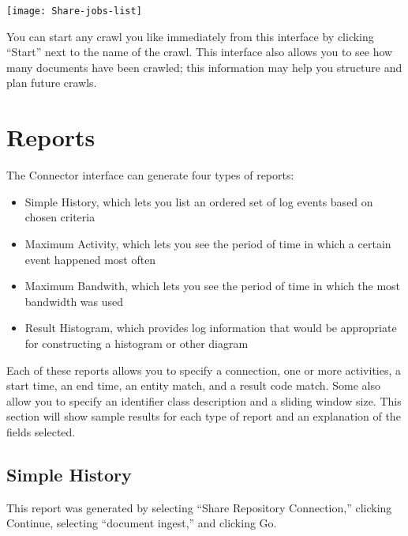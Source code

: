 \begin{changemargin}{1.5in}{0in}
\texttt{[image: Share-jobs-list]}

You can start any crawl you like immediately from this interface by
clicking ``Start'' next to the name of the crawl. This interface also
allows you to see how many documents have been crawled; this information
may help you structure and plan future crawls.


\section{Reports}

The Connector interface can generate four types of reports:

\begin{itemize}

\item Simple History, which lets you list an ordered set of log events
based on chosen criteria

\item Maximum Activity, which lets you see the period of time in
which a certain event happened most often

\item Maximum Bandwith, which lets you see the period of time in
which the most bandwidth was used 

\item Result Histogram, which provides log information that would be
appropriate for constructing a histogram or other diagram

\end{itemize}

Each of these reports allows you to specify a connection, one or more
activities, a start time, an end time, an entity match, and a result code
match.  Some also allow you to specify an identifier class description
and a sliding window size. This section will show sample results for
each type of report and an explanation of the fields selected.

\subsection{Simple History}

This report was generated by selecting ``Share Repository Connection,'' 
clicking Continue, selecting ``document ingest,'' and clicking Go.


\end{changemargin}
